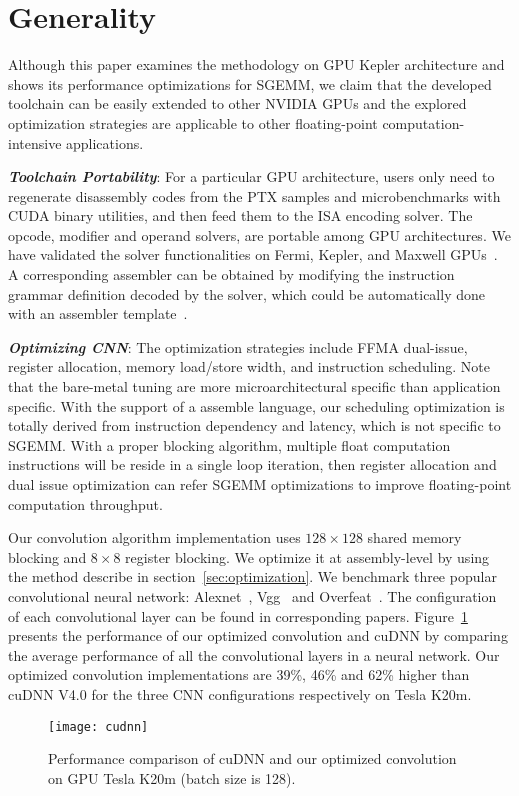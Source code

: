 \section{Generality}
\label{sec:generality}

Although this paper examines the methodology on GPU Kepler architecture and shows its performance optimizations for SGEMM, we claim that the developed toolchain can be easily extended to other NVIDIA GPUs and the explored optimization strategies are applicable to other floating-point computation-intensive applications.

{\em {\bf Toolchain Portability}}: For a particular GPU architecture, users only need to regenerate disassembly codes from the PTX samples and microbenchmarks with CUDA binary utilities, and then feed them to the ISA encoding solver.
The opcode, modifier and operand solvers, are portable among GPU architectures. 
We have validated the solver functionalities on Fermi, Kepler, and Maxwell GPUs~\cite{artifact}. 
A corresponding assembler can be obtained by modifying the instruction grammar definition decoded by the solver, which could be automatically done with an assembler template~\cite{baldassin2005extending}.

{\em {\bf Optimizing CNN}}: The optimization strategies include
FFMA dual-issue, register allocation, memory load/store width, and instruction
scheduling. Note that the bare-metal tuning are more microarchitectural specific than application specific. With the support of a assemble language, our scheduling optimization is totally derived from instruction dependency and latency, which is not specific to SGEMM. With a proper blocking algorithm, multiple float computation instructions will be reside in a single loop iteration, then register allocation and dual issue optimization can refer SGEMM optimizations to improve floating-point computation throughput. 

Our convolution algorithm implementation uses $128\times128$ shared memory blocking and
$8\times8$ register blocking. We optimize it at assembly-level by using the method describe in section~\ref{sec:optimization}.
We benchmark three popular convolutional neural network:
Alexnet~\cite{krizhevsky2012imagenet}, Vgg~\cite{simonyan2014very} and
Overfeat~\cite{sermanet2013overfeat}.  The configuration of each convolutional
layer can be found in corresponding papers.
Figure~\ref{fig:conv} presents the performance of our optimized convolution and cuDNN by comparing the average performance of all the convolutional layers in a neural network. %
Our optimized convolution implementations are 39\%, 46\% and 62\% higher than cuDNN V4.0 for the three CNN configurations respectively on Tesla K20m.

\begin{figure}[htbp]
\begin{center}
\texttt{[image: cudnn]}
    \caption{\small Performance comparison of cuDNN and our optimized convolution on GPU Tesla K20m (batch size is 128).}
\label{fig:conv}
\end{center}
\end{figure}
